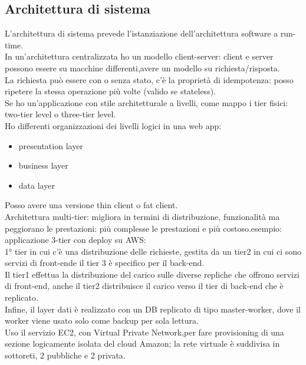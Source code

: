 \documentclass{article}
\begin{document}
\subsection{Architettura di sistema}
L'architettura di sistema prevede l'istanziazione dell'architettura software a run-time.\\In un'architettura centralizzata ho un modello client-server: client e server possono essere su macchine differenti,avere un modello su richiesta/risposta.\\ La richiesta può essere con o senza stato, c'è la proprietà di idempotenza: posso ripetere la stessa operazione più volte (valido se stateless).\\ Se ho un'applicazione con stile architetturale a livelli, come mappo i tier fisici: two-tier level o three-tier level.\\  Ho differenti organizzazioni dei livelli logici in una web app:
\begin{itemize}
\item presentation layer
\item business layer
\item data layer
\end{itemize}
Posso avere una versione thin client o fat client.\\ Architettura multi-tier: migliora in termini di distribuzione, funzionalità ma peggiorano le prestazioni: più complesse le prestazioni e più costoso.esempio: applicazione 3-tier con deploy su AWS:\\
1° tier in cui c'è una distribuzione delle richieste, gestita da un tier2 in cui ci sono servizi di front-ende il tier 3 è specifico per il back-end.\\ Il tier1 effettua la distribuzione del carico sulle diverse repliche che offrono servizi di front-end, anche il tier2 distribuisce il carico verso il tier di back-end che è replicato.\\ Infine, il layer dati è realizzato con un DB replicato di tipo master-worker, dove il worker viene usato solo come backup per sola lettura.\\ Uso il servizio EC2, con Virtual Private Network,per fare provisioning di una sezione logicamente isolata del cloud Amazon; la rete virtuale è suddivisa in sottoreti, 2 pubbliche e 2 privata.
\end{document}
